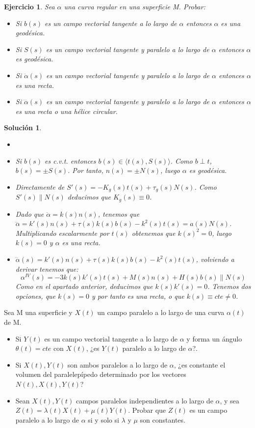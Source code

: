 \documentclass{article}
\theoremstyle{plain}
\newtheorem{exercise}{Ejercicio}
\newtheorem*{sol*}{Solución}
\providecommand{\gene}[1]{\langle{#1}\rangle}
\newenvironment{ejercicio}[2][Estado]{\begin{trivlist}
\item[\hskip \labelsep {\bfseries Ejercicio}\hskip \labelsep {\bfseries #2.}]}{\end{trivlist}}
\begin{document}
\newpage
\begin{exercise}
Sea $\alpha$ una curva regular en una superficie M. Probar:
\begin{itemize}
\item Si $b(s)$ es un campo vectorial tangente a lo largo de $\alpha$ entonces $\alpha$ es una geodésica.
\item Si $S(s)$ es un campo vectorial tangente y paralelo a lo largo de $\alpha$ entonces $\alpha$ es geodésica.
\item Si $\ddot{\alpha}(s)$ es un campo vectorial tangente y paralelo a lo largo de $\alpha$ entonces $\alpha$ es una recta.
\item Si $\dddot{\alpha}(s)$ es un campo vectorial tangente y paralelo a lo largo de $\alpha$ entonces $\alpha$ es una recta o una hélice circular.
\end{itemize}
\end{exercise}
\begin{sol*}
\begin{itemize}
\item[]
\item Si $b(s)$ es c.v.t. entonces $b(s)\in\gene{t(s),S(s)}$. Como $b\perp t$, $b(s)=\pm S(s)$. Por tanto, $n(s)=\pm N(s)$, luego $\alpha$ es geodésica.
\item Directamente de $S'(s)=-K_g(s)t(s)+\tau_g(s)N(s)$. Como $S'(s)\parallel N(s)$ deducimos que $K_g(s)\equiv 0$.
\item Dado que $\ddot{\alpha} = k(s)n(s)$, tenemos que $\dddot{\alpha}= k'(s)n(s)+\tau(s)k(s)b(s)-k^2(s)t(s) =a(s) N(s)$. Multiplicando escalarmente por $t(s)$ obtenemos que $k(s)^2 = 0$, luego $k(s)=0$ y $\alpha$ es una recta.
\item $\dddot{\alpha}(s)= k'(s)n(s)+\tau(s)k(s)b(s)-k^2(s)t(s)$, volviendo a derivar tenemos que:
\[
\alpha^{IV}(s) = -3k(s)k'(s)t(s)+M(s)n(s) + H(s)b(s) \parallel N(s)
\]
Como en el apartado anterior, deducimos que $k(s)k'(s)=0$. Tenemos dos opciones, que $k(s)=0$ y por tanto es una recta, o que $k(s)\equiv cte \neq 0$.
\end{itemize}
\end{sol*}
\newpage
\begin{ejercicio}{8} Sea M una superficie y $X(t)$ un campo paralelo a lo largo de una curva $\alpha(t)$ de M. 
\begin{itemize}
\item Si $Y(t)$ es un campo vectorial tangente a lo largo de $\alpha$ y forma un ángulo $\theta(t) = cte$ con $X(t)$, ¿es $Y (t)$ paralelo a lo largo de $\alpha$?.
\item Si $X(t),Y (t)$ son ambos paralelos a lo largo de $\alpha$, ¿es constante el volumen del paralelepípedo determinado por los vectores $N(t),X(t),Y (t)$?
\item Sean $ X(t),Y (t)$ campos paralelos independientes a lo largo de $\alpha$, y sea $Z(t) = \lambda(t)X(t)+\mu (t)Y (t)$. Probar que $Z(t)$ es un campo paralelo a lo largo de $\alpha$ si y solo si $\lambda$ y $\mu$ son constantes.
\end{itemize}
\end{ejercicio}
\end{document}

